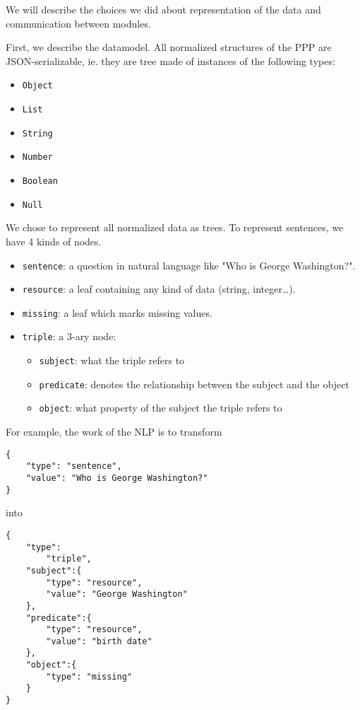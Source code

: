 We will describe the choices we did about representation of the data and communication between modules.

\bigskip

First, we describe the datamodel. All normalized structures of the PPP are JSON-serializable, ie. they are tree made of instances of the following types:
\begin{itemize}
    \item \texttt{Object}
    \item \texttt{List}
    \item \texttt{String}
    \item \texttt{Number}
    \item \texttt{Boolean}
    \item \texttt{Null}
\end{itemize}

We chose to represent all normalized data as trees. To represent sentences, we have 4 kinds of nodes.

\begin{itemize}
    \item \texttt{sentence}: a question in natural language like "Who is George Washington?".
    \item \texttt{resource}: a leaf containing any kind of data (string, integer\ldots).
    \item \texttt{missing}: a leaf which marks missing values.
    \item \texttt{triple}: a 3-ary node:
        \begin{itemize}
            \item \texttt{subject}: what the triple refers to
            \item \texttt{predicate}: denotes the relationship between the subject and the
  object
            \item \texttt{object}: what property of the subject the triple refers to
        \end{itemize}         
\end{itemize}

For example, the work of the NLP is to transform 
\begin{verbatim}
{
    "type": "sentence", 
    "value": "Who is George Washington?"
}
\end{verbatim}
into 
\begin{verbatim}
{
    "type":
        "triple",
    "subject":{
        "type": "resource",
        "value": "George Washington"
    },
    "predicate":{
        "type": "resource",
        "value": "birth date"
    },
    "object":{
        "type": "missing"
    }
}
\end{verbatim}

